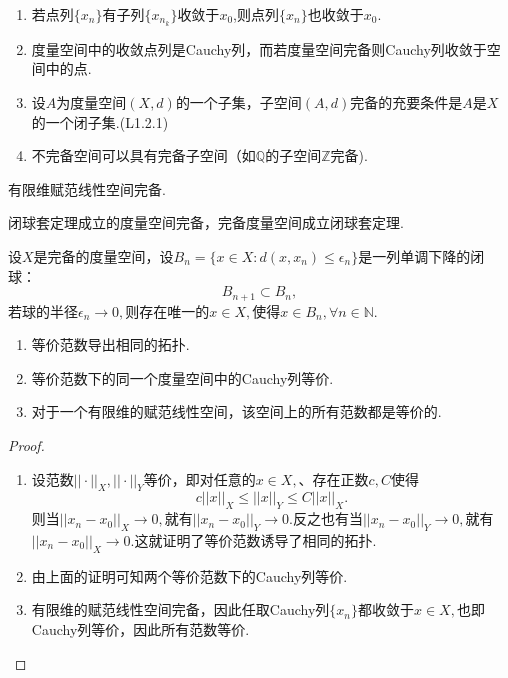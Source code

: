 \documentclass[lang=cn,10pt]{elegantbook}
\begin{document}
	\begin{property}
		\begin{enumerate}
			\item 若点列\(\{x_n\}\)有子列\(\{x_{n_k}\}\)收敛于\(x_0\),则点列\(\{x_n\}\)也收敛于\(x_0\).
			\item 度量空间中的收敛点列是Cauchy列，而若度量空间完备则Cauchy列收敛于空间中的点.
			\item 设\(A\)为度量空间\((X,d)\)的一个子集，子空间\((A,d)\)完备的充要条件是\(A\)是\(X\)的一个闭子集.(L1.2.1)
			\item 不完备空间可以具有完备子空间（如\(\mathbb{Q}\)的子空间\(\mathbb{Z}\)完备).
		\end{enumerate}
	\end{property}
	\begin{corollary}[T1.4.2]
		有限维赋范线性空间完备.
	\end{corollary}
	
	\begin{theorem}[闭球套定理和度量空间的完备性等价(T1.4.4,1.4.5)]
		闭球套定理成立的度量空间完备，完备度量空间成立闭球套定理.

		设\(X\)是完备的度量空间，设\(B_n=\{x\in X:d(x,x_n) \le \epsilon_n\}\)是一列单调下降的闭球：
		\[B_{n+1} \subset B_n,\]
		若球的半径\(\epsilon_n \to 0,\)则存在唯一的\(x\in X,\)使得\(x\in B_n,\forall n\in \mathbb{N}.\)
	\end{theorem}
	\begin{corollary}
		\begin{enumerate}
			\item 等价范数导出相同的拓扑.
			\item 等价范数下的同一个度量空间中的Cauchy列等价.
			\item 对于一个有限维的赋范线性空间，该空间上的所有范数都是等价的.
		\end{enumerate}
	\end{corollary}
	\begin{proof}
		\begin{enumerate}
			\item 设范数\(||\cdot||_X,||\cdot||_Y\)等价，即对任意的\(x\in X,\)、存在正数\(c,C\)使得
			\[c||x||_X\le ||x||_Y\le C||x||_X.\]
			则当\(||x_n-x_0||_X\to 0,\)就有\(||x_n-x_0||_Y\to 0.\)反之也有当\(||x_n-x_0||_Y\to 0,\)就有\(||x_n-x_0||_X\to 0.\)这就证明了等价范数诱导了相同的拓扑.
			\item 由上面的证明可知两个等价范数下的Cauchy列等价.
			\item 有限维的赋范线性空间完备，因此任取Cauchy列\(\{x_n\}\)都收敛于\(x\in X,\)也即Cauchy列等价，因此所有范数等价.
		\end{enumerate}
	\end{proof}
	
\end{document}
